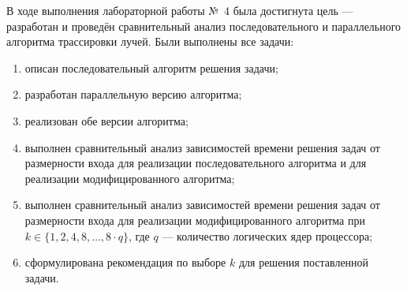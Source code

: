 В ходе выполнения лабораторной работы №~4 была достигнута цель --- разработан и проведён сравнительный анализ последовательного и параллельного алгоритма трассировки лучей. Были выполнены все задачи:
\begin{enumerate}
	\item описан последовательный алгоритм решения задачи;
	\item разработан параллельную версию алгоритма;
	\item реализован обе версии алгоритма;
	\item выполнен сравнительный анализ зависимостей времени решения задач от размерности входа для реализации последовательного алгоритма и для реализации модифицированного алгоритма;
	\item выполнен сравнительный анализ зависимостей времени решения задач от размерности входа для реализации модифицированного алгоритма при $k \in \{1, 2, 4, 8, \dots, 8 \cdot q\}$, где $q$ --- количество логических ядер процессора;
	\item сформулирована рекомендация по выборе $k$ для решения поставленной задачи.
\end{enumerate}